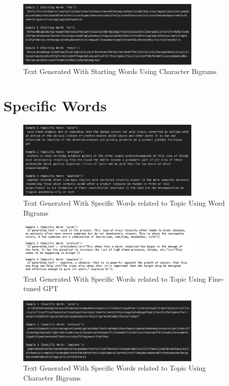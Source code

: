 \documentclass[journal,onecolumn]{IEEEtran}
\begin{document}
\begin{figure}[H]
    \centering
    \includegraphics[width=0.8\textwidth]{CharacterBigrams/StartingWords_CharBigrams.png} %
    \caption{Text Generated With Starting Words Using Character Bigrams}
    \label{fig:example_result}
\end{figure}


\section{Specific Words}
\begin{figure}[H]
    \centering
    \includegraphics[width=0.8\textwidth]{WordBigrams/TopicSpecificWords_Bigram.png} %
    \caption{Text Generated With Specific Words related to Topic Using Word Bigrams}
    \label{fig:example_result}
\end{figure}

\begin{figure}[H]
    \centering
    \includegraphics[width=0.8\textwidth]{GPT/SpecificWords_GPT.png} %
    \caption{Text Generated With Specific Words related to Topic Using Fine-tuned GPT}
    \label{fig:example_result}
\end{figure}

\begin{figure}[H]
    \centering
    \includegraphics[width=0.8\textwidth]{CharacterBigrams/SpecificWords_CharBigrams.png} %
    \caption{Text Generated With Specific Words related to Topic Using Character Bigrams}
    \label{fig:example_result}
\end{figure}
\end{document}
